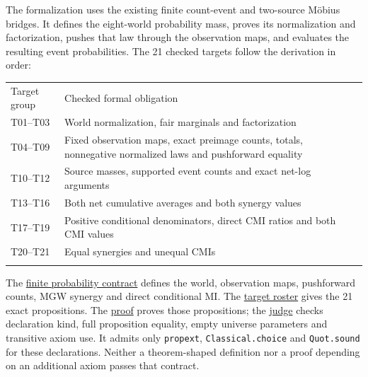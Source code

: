 The formalization uses the existing finite count-event and two-source Möbius bridges. It defines the eight-world probability mass, proves its normalization and factorization, pushes that law through the observation maps, and evaluates the resulting event probabilities. The 21 checked targets follow the derivation in order:

{\def\LTcaptype{none} %
\begin{longtable}[]{@{}
  >{\raggedright\arraybackslash}p{}
  >{\raggedright\arraybackslash}p{}@{}}
\toprule\noalign{}
\begin{minipage}[b]{\linewidth}\raggedright
Target group
\end{minipage} & \begin{minipage}[b]{\linewidth}\raggedright
Checked formal obligation
\end{minipage} \\*
\midrule\noalign{}
\endhead
\bottomrule\noalign{}
\endfoot
T01--T03 & World normalization, fair marginals and factorization \\*
T04--T09 & Fixed observation maps, exact preimage counts, totals, nonnegative normalized laws and pushforward equality \\*
T10--T12 & Source masses, supported event counts and exact net-log arguments \\*
T13--T16 & Both net cumulative averages and both synergy values \\*
T17--T19 & Positive conditional denominators, direct CMI ratios and both CMI values \\*
T20--T21 & Equal synergies and unequal CMIs \\*
\end{longtable}
}

The \href{https://github.com/sepahead/pid-rs/blob/main/audit/formal/lean-mgw-fixed-world/PidMgwFixedWorld/Contract.lean}{finite probability contract} defines the world, observation maps, pushforward counts, MGW synergy and direct conditional MI. The \href{https://github.com/sepahead/pid-rs/blob/main/audit/formal/lean-mgw-fixed-world/PidMgwFixedWorld/RawTargets.lean}{target roster} gives the 21 exact propositions. The \href{https://github.com/sepahead/pid-rs/blob/main/audit/formal/lean-mgw-fixed-world/PidMgwFixedWorld/Candidate.lean}{proof} proves those propositions; the \href{https://github.com/sepahead/pid-rs/blob/main/audit/formal/lean-mgw-fixed-world/PidMgwFixedWorld/Judge.lean}{judge} checks declaration kind, full proposition equality, empty universe parameters and transitive axiom use. It admits only \texttt{propext}, \texttt{Classical.choice} and \texttt{Quot.sound} for these declarations. Neither a theorem-shaped definition nor a proof depending on an additional axiom passes that contract.

